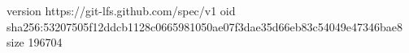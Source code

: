version https://git-lfs.github.com/spec/v1
oid sha256:53207505f12ddcb1128c0665981050ae07f3dae35d66eb83c54049e47346bae8
size 196704
